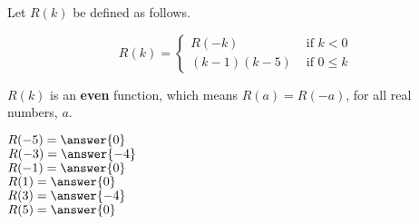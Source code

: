 \documentclass{ximera}
\author{Lee Wayand}
\begin{document}
\begin{exercise}




Let $R(k)$ be defined as follows.

\[
R(k) = 
\begin{cases}
  R(-k) & \text{ if }  k < 0 \\
  (k-1)(k-5) & \text{ if } 0 \leq k 
\end{cases}
\]

$R(k)$ is an \textbf{even} function, which means $R(a) = R(-a)$, for all real numbers, $a$. \\


\begin{question}




$R(-5) = \answer{0}$ \\


$R(-3) = \answer{-4}$ \\


$R(-1) = \answer{0}$ \\


$R(1) = \answer{0}$ \\


$R(3) = \answer{-4}$ \\


$R(5) = \answer{0}$ \\




\end{question}


\end{exercise}
\end{document}
